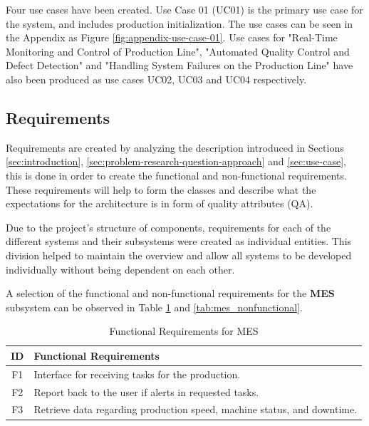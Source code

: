 Four use cases have been created. Use Case 01 (UC01) is the primary use case for the system, and includes production initialization. The use cases can be seen in the Appendix as Figure \ref{fig:appendix-use-case-01}. Use cases for "Real-Time Monitoring and Control of Production Line", "Automated Quality Control and Defect Detection" and "Handling System Failures on the Production Line" have also been produced as use cases UC02, UC03 and UC04 respectively.

\subsection{Requirements}
Requirements are created by analyzing the description introduced in Sections \ref{sec:introduction}, \ref{sec:problem-research-question-approach} and \ref{sec:use-case}, this is done in order to create the functional and non-functional requirements. These requirements will help to form the classes and describe what the expectations for the architecture is in form of quality attributes (QA).

Due to the project's structure of components, requirements for each of the different systems and their subsystems were created as individual entities. This division helped to maintain the overview and allow all systems to be developed individually without being dependent on each other. 


A selection of the functional and non-functional requirements for the \textbf{MES} subsystem can be observed in Table \ref{tab:mes_functional} and \ref{tab:mes_nonfunctional}.

\begin{table}[H]
    \centering
    \caption{Functional Requirements for MES}
    \label{tab:mes_functional}
    \begin{tabular}{|c|p{6cm}|}
        \hline
        \textbf{ID} & \textbf{Functional Requirements} \\
        \hline
        F1 & Interface for receiving tasks for the production. \\
        \hline
        F2 & Report back to the user if alerts in requested tasks. \\
        \hline
        F3 & Retrieve data regarding production speed, machine status, and downtime. \\
        \hline
    \end{tabular}
\end{table}


